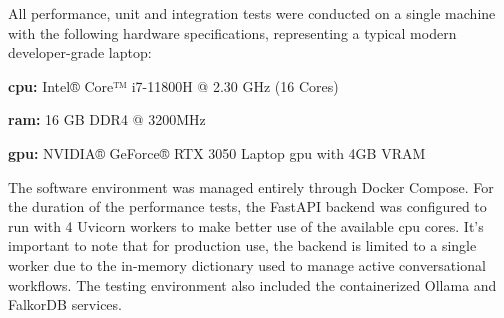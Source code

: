 All performance, unit and integration tests were conducted on a single machine with the following hardware specifications, representing a typical modern developer-grade laptop:
\begin{compactitem}[\textbullet]
    \item \textbf{\acs{cpu}:} Intel® Core™ i7-11800H @ 2.30 GHz (16 Cores)
    \item \textbf{\acs{ram}:} 16 GB DDR4 @ 3200MHz
    \item \textbf{\acs{gpu}:} NVIDIA® GeForce® RTX 3050 Laptop \acs{gpu} with 4GB VRAM
\end{compactitem}

The software environment was managed entirely through Docker Compose. For the duration of the performance tests, the FastAPI backend was configured to run with 4 Uvicorn workers to make better use of the available \acs{cpu} cores. It's important to note that for production use, the backend is limited to a single worker due to the in-memory dictionary used to manage active conversational workflows. The testing environment also included the containerized Ollama and FalkorDB services.